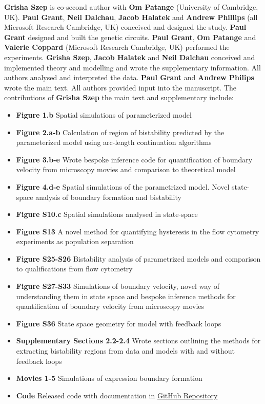 \textbf{Grisha Szep} is co-second author with \textbf{Om Patange} (University of Cambridge, UK). \textbf{Paul Grant}, \textbf{Neil Dalchau}, \textbf{Jacob Halatek} and \textbf{Andrew Phillips} (all Microsoft Research Cambridge, UK) conceived and designed the study. \textbf{Paul Grant} designed and built the genetic circuits. \textbf{Paul Grant}, \textbf{Om Patange} and \textbf{Valerie Coppard} (Microsoft Research Cambridge, UK) performed the experiments. \textbf{Grisha Szep}, \textbf{Jacob Halatek} and \textbf{Neil Dalchau} conceived and implemented theory and modelling and wrote the supplementary information. All authors analysed and interpreted the data. \textbf{Paul Grant} and \textbf{Andrew Philips} wrote the main text. All authors provided input into the manuscript. The contributions of \textbf{Grisha Szep} the main text and supplementary include:
\begin{itemize}
    \item \textbf{Figure 1.b} Spatial simulations of parameterized model
    \item \textbf{Figure 2.a-b} Calculation of region of bistability predicted by the parameterized model using arc-length continuation algorithms
    \item \textbf{Figure 3.b-e} Wrote bespoke inference code for quantification of boundary velocity from microscopy movies and comparison to theoretical model
    \item \textbf{Figure 4.d-e} Spatial simulations of the parametrized model. Novel state-space analysis of boundary formation and bistability
    \item \textbf{Figure S10.c} Spatial simulations analysed in state-space
    \item \textbf{Figure S13} A novel method for quantifying hysteresis in the flow cytometry experiments as population separation
    \item \textbf{Figure S25-S26} Bistability analysis of parametrized models and comparison to qualifications from flow cytometry
    \item \textbf{Figure S27-S33} Simulations of boundary velocity, novel way of understanding them in state space and bespoke inference methods for quantification of boundary velocity from microscopy movies
    \item \textbf{Figure S36} State space geometry for model with feedback loops
    \item \textbf{Supplementary Sections 2.2-2.4} Wrote sections outlining the methods for extracting bistability regions from data and models with and without feedback loops
    \item \textbf{Movies 1-5} Simulations of expression boundary formation
    \item \textbf{Code} Released code with documentation in \href{https://github.com/gszep/double-exclusive-reporter}{GitHub Repository}
\end{itemize}

